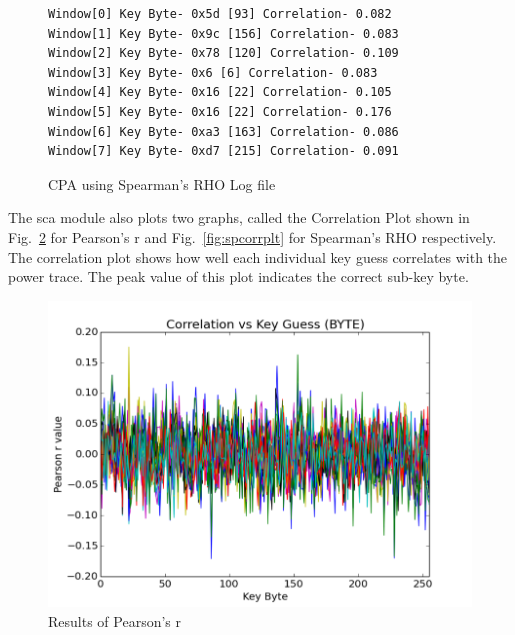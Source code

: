 \documentclass{llncs}
\numberwithin{algorithm}{chapter}
\begin{document}
\begin{figure}[h]
\begin{Verbatim}[frame=single]
Window[0] Key Byte- 0x5d [93] Correlation- 0.082
Window[1] Key Byte- 0x9c [156] Correlation- 0.083
Window[2] Key Byte- 0x78 [120] Correlation- 0.109
Window[3] Key Byte- 0x6 [6] Correlation- 0.083
Window[4] Key Byte- 0x16 [22] Correlation- 0.105
Window[5] Key Byte- 0x16 [22] Correlation- 0.176
Window[6] Key Byte- 0xa3 [163] Correlation- 0.086
Window[7] Key Byte- 0xd7 [215] Correlation- 0.091
\end{Verbatim}
\caption{\label{fig:spearman}CPA using Spearman's RHO Log file }
\end{figure}

The sca module also plots two graphs, called the Correlation Plot 
shown in Fig.~\ref{fig:prcorrplt} for Pearson's r and Fig.~\ref{fig:spcorrplt} for 
Spearman's RHO respectively.  
The correlation plot shows how well each individual key guess correlates with the power trace.
The peak value of this plot indicates the correct sub-key byte. 

\begin{figure}[H]
\begin{center}
\includegraphics[scale=0.8]{figures/pearson-r}
\caption{\label{fig:prcorrplt}Results of Pearson's r}
\end{center} 
\vspace{-3ex}
\end{figure}
\end{document}
